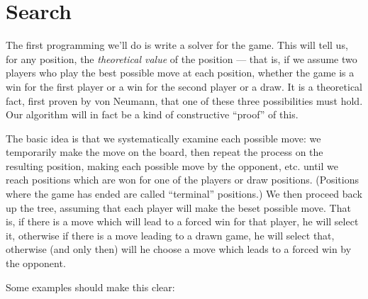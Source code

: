 \documentclass[10pt,dvipdfmx,letterpaper]{report}
\begin{document}
\section{Search}
The first programming we'll do is write a solver for the game.
This will tell us, for any position, the {\em theoretical value}
of the position  --- that is, if we assume two players who play
the best possible move at each position, whether the game is a win
for the first player or a win for the second player or a draw.
It is a theoretical fact, first proven by von Neumann, that one of
these three possibilities must hold.  Our algorithm will in fact be
a kind of constructive ``proof'' of this.

The basic idea is that we systematically examine each possible move:
we temporarily make the move on the board, then repeat the process
on the resulting position, making each possible move by the opponent,
etc. until we reach positions which are won for one of the players
or draw positions.  (Positions where the game has ended are called
``terminal'' positions.)  We then proceed back up the tree, assuming
that each player will make the beset possible move.  That is, if there
is a move which will lead to a forced win for that player,
he will select it, otherwise if there is a move leading to a drawn game,
he will select that, otherwise (and only then) will he choose a move
which leads to a forced win by the opponent.

Some examples should make this clear:
\end{document}
